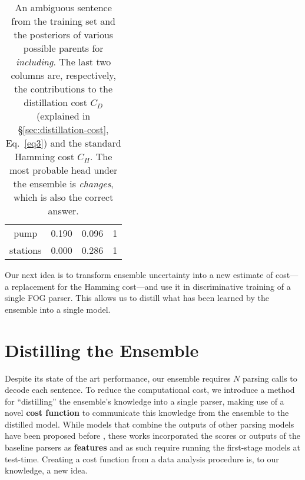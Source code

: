 \documentclass[11pt,letterpaper]{article}
\newcommand{\ignore}[1]{}
\newcommand{\cjd}[1]{\textcolor{cyan}{\ignore{{\textbf{[#1 --\textsc{cjd}]}}}}}
\begin{document}
\begin{table}[t]
\begin{center}
\begin{tabular}{|c|r|r|r|}
pump                                                                                               & 0.190 &0.096 & 1 \\
stations & 0.000 & 0.286 & 1 \\ \hline                                                                                                                   
\end{tabular}
\end{center}
\caption{An ambiguous sentence from the training set and the posteriors\protect\footnotemark{} of various possible parents for \emph{including}. The last two columns are, respectively, the contributions to the distillation cost $C_D$
(explained in \S\ref{sec:distillation-cost}, Eq.~\ref{eq3}) and the standard Hamming cost $C_H$. The most probable head under the ensemble is \emph{changes}, which is also the correct answer.} \label{tab:qualitative_analysis}
\end{table}







Our next idea is to transform ensemble uncertainty into a new estimate of cost---a replacement for the Hamming cost---and use it in discriminative training of a single FOG parser.  This allows us to distill what has been learned by the ensemble into a single model.








\section{Distilling the Ensemble} \label{sec:distillation}
Despite its state of the art performance, our ensemble requires $N$ parsing calls to decode each sentence.  To reduce the computational cost, we introduce a method for
``distilling'' the ensemble's knowledge into a single parser, making use of a novel \textbf{cost function} to communicate this knowledge from the ensemble to the distilled model.
While models that combine the outputs of other parsing models have been proposed before \cite[\emph{inter alia}]{stacking,NivreIGA08,combine_beam_search}, these works incorporated the scores or outputs of the baseline parsers as \textbf{features} and as such require running the first-stage models at test-time.\cjd{there was way too much detail that was interrupting the exposition of the new idea here, so i cut some stuff} 
Creating a cost function from a data analysis procedure is, to our knowledge, a new idea. 
\end{document}
